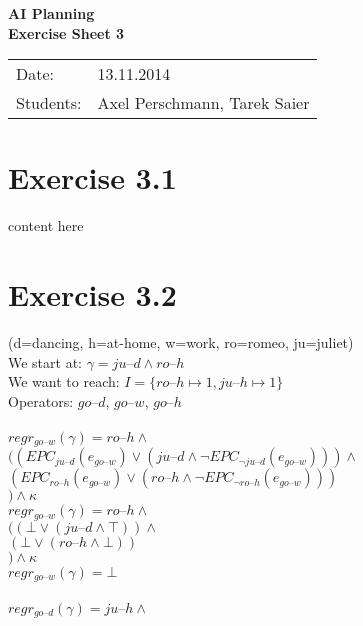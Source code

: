 \documentclass[11pt,a4paper]{article}
\newcommand{\h}[0]{\text{--}}
\begin{document}
\begin{center}
\Huge{\textbf{AI Planning}}\\
\LARGE{\textbf{Exercise Sheet 3}}
\end{center}
\vspace{2cm}
\begin{tabular}{ll}
Date: & 13.11.2014\\
Students: & Axel Perschmann, Tarek Saier
\end{tabular}

\section*{Exercise 3.1}
content here

\section*{Exercise 3.2}
(d=dancing, h=at-home, w=work, ro=romeo, ju=juliet)\\
We start at: $\gamma=ju\h d\land ro\h h$\\
We want to reach: $I=\{ro\h h\mapsto1,ju\h h\mapsto1\}$\\
Operators: $go\h d$, $go\h w$, $go\h h$\\
\\
$regr_{go\h w}(\gamma)=ro\h h\land$\\
\hphantom{aaaa}$((EPC_{ju\h d}(e_{go\h w})\lor (ju\h d\land \neg EPC_{\neg ju\h d}(e_{go\h w})))\land$\\
\hphantom{aaaaaa}$(EPC_{ro\h h}(e_{go\h w})\lor (ro\h h\land \neg EPC_{\neg ro\h h}(e_{go\h w})))$\\
\hphantom{aaaa}$) \land \kappa$\\
$regr_{go\h w}(\gamma)=ro\h h\land$\\
\hphantom{aaaa}$((\bot \lor (ju\h d\land \top))\land$\\
\hphantom{aaaaaa}$(\bot \lor (ro\h h\land \bot))$\\
\hphantom{aaaa}$) \land \kappa$\\
$regr_{go\h w}(\gamma)=\bot$\\
\\
$regr_{go\h d}(\gamma)=ju\h h\land$\\
\end{document}
